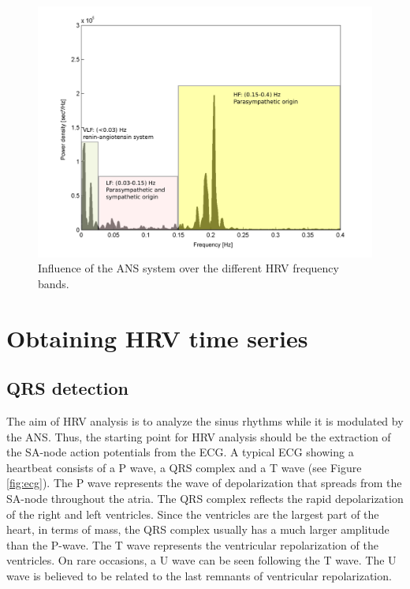 \documentclass[12pt,lot, lof]{puthesis}
\begin{document}
\begin{figure}[ht]
\begin{center}
\includegraphics[scale=0.4]{figures/hrvSpectrum.pdf}
\caption{\label{fig:hrvSpectrum} Influence of the ANS system over the different 
HRV frequency bands.}
\end{center}
\end{figure} 

\section{Obtaining HRV time series\label{sec:obtainingHRV}}
\subsection{QRS detection\label{QRS-detection}}

The aim of \gls{HRV} analysis is to analyze the sinus rhythms while it is 
modulated by the \gls{ANS}.  Thus, the starting point for \gls{HRV} analysis 
should be the extraction of the SA-node action potentials from the \gls{ECG}.
A typical \gls{ECG} showing a heartbeat consists of a P wave, a QRS complex and 
a T wave (see Figure \ref{fig:ecg}). The P wave represents the wave of 
depolarization that spreads from the SA-node throughout the atria. 
The QRS complex reflects the rapid depolarization of the right and left 
ventricles. Since the ventricles are the largest part of the heart, in terms of 
mass, the QRS complex usually has a much larger amplitude than the P-wave. The 
T wave represents the ventricular repolarization of the ventricles.
On rare occasions, a U wave can be seen following the T wave. The U wave is 
believed to be related to the last remnants of ventricular repolarization.\\
\end{document}
